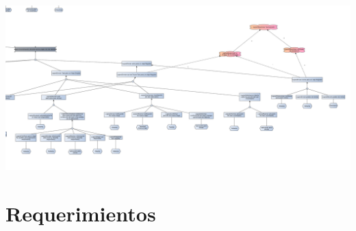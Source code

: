 \documentclass[a4paper]{article}
\begin{document}
\begin{center}
\includegraphics[width=1.4\textwidth,keepaspectratio,angle=90]{diagrama_objetivos_5.pdf}
\end{center}

\section{Requerimientos}
\end{document}
